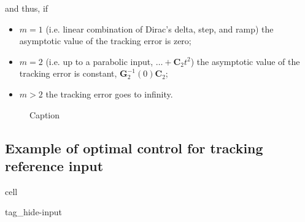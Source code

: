 \documentclass[letterpaper,10pt,english]{jupyterBook}
\begin{document}
and thus, if
\begin{itemize}
\item {} 
\sphinxAtStartPar
\(m = 1\) (i.e. linear combination of Dirac’s delta, step, and ramp) the asymptotic value of the tracking error is zero;

\item {} 
\sphinxAtStartPar
\(m = 2\) (i.e. up to a parabolic input, \(\dots + \mathbf{C}_2 t^2\)) the asymptotic value of the tracking error is constant, \(\mathbf{G}_2^{-1}(0) \mathbf{C}_2\);

\item {} 
\sphinxAtStartPar
\(m > 2\) the tracking error goes to infinity.

\end{itemize}

\begin{figure}[htbp]
\centering
\capstart

\noindent{}
\caption{Caption}\label{\detokenize{ch/control/optimal-control-ref-tracking:fig-optimal-tracking-ramp}}\end{figure}

\sphinxstepscope


\subsection{Example of optimal control for tracking reference input}
\label{\detokenize{ch/control/optimal-control-ref-tracking-example:example-of-optimal-control-for-tracking-reference-input}}\label{\detokenize{ch/control/optimal-control-ref-tracking-example:control-optimal-ref-tracking-example}}\label{\detokenize{ch/control/optimal-control-ref-tracking-example::doc}}
\begin{sphinxuseclass}{cell}
\begin{sphinxuseclass}{tag_hide-input}
\end{sphinxuseclass}
\end{sphinxuseclass}
\end{document}
